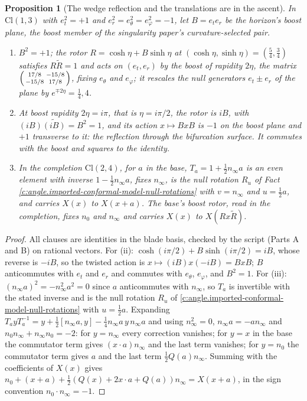 \documentclass[11pt]{article}
\newtheorem{proposition}[theorem]{Proposition}
\theoremstyle{definition}
\theoremstyle{plain}
\providecommand{\Cl}{}\renewcommand{\Cl}{\mathrm{Cl}}
\providecommand{\nInf}{}\renewcommand{\nInf}{n_\infty}
\providecommand{\nO}{}\renewcommand{\nO}{n_0}
\begin{document}
\begin{proposition}[The wedge reflection and the translations are in the ascent]\label{c:angle.wedge-reflection-translations-are-ascent}
In $\Cl(1,3)$ with $e_{t}^{2} = +1$ and $e_{r}^{2} = e_{\theta}^{2} = e_{\varphi}^{2} = -1$, let $B = e_{t}e_{r}$ be the horizon's boost plane, the boost member of the singularity paper's curvature-selected pair.
\begin{enumerate}
\item[(i)] $B^{2} = +1$; the rotor $R = \cosh\eta + B\sinh\eta$ at $(\cosh\eta, \sinh\eta) = (\tfrac54, \tfrac34)$ satisfies $R\widetilde{R} = 1$ and acts on $(e_{t}, e_{r})$ by the boost of rapidity $2\eta$, the matrix $\begin{psmallmatrix} 17/8 & -15/8 \\ -15/8 & 17/8\end{psmallmatrix}$, fixing $e_{\theta}$ and $e_{\varphi}$; it rescales the null generators $e_{t} \pm e_{r}$ of the plane by $e^{\mp 2\eta} = \tfrac14, 4$.
\item[(ii)] At boost rapidity $2\eta = i\pi$, that is $\eta = i\pi/2$, the rotor is $iB$, with $(iB)\widetilde{(iB)} = B^{2} = 1$, and its action $x \mapsto BxB$ is $-1$ on the boost plane and $+1$ transverse to it: the reflection through the bifurcation surface. It commutes with the boost and squares to the identity.
\item[(iii)] In the completion $\Cl(2,4)$, for $a$ in the base, $T_{a} = 1 + \tfrac12\nInf a$ is an even element with inverse $1 - \tfrac12\nInf a$, fixes $\nInf$, is the null rotation $R_{u}$ of Fact \ref{c:angle.imported-conformal-model-null-rotations} with $v = \nInf$ and $u = \tfrac12 a$, and carries $X(x)$ to $X(x + a)$. The base's boost rotor, read in the completion, fixes $\nO$ and $\nInf$ and carries $X(x)$ to $X(Rx\widetilde{R})$.
\end{enumerate}
\end{proposition}
\begin{proof}
All clauses are identities in the blade basis, checked by the script (Parts A and B) on rational vectors. For (ii): $\cosh(i\pi/2) + B\sinh(i\pi/2) = iB$, whose reverse is $-iB$, so the twisted action is $x \mapsto (iB)x(-iB) = BxB$; $B$ anticommutes with $e_{t}$ and $e_{r}$ and commutes with $e_{\theta}$, $e_{\varphi}$, and $B^{2} = 1$. For (iii): $(\nInf a)^{2} = -\nInf^{2}a^{2} = 0$ since $a$ anticommutes with $\nInf$, so $T_{a}$ is invertible with the stated inverse and is the null rotation $R_{u}$ of \ref{c:angle.imported-conformal-model-null-rotations} with $u = \tfrac12 a$. Expanding $T_{a}yT_{a}^{-1} = y + \tfrac12[\nInf a, y] - \tfrac14\nInf a\,y\,\nInf a$ and using $\nInf^{2} = 0$, $\nInf a = -a\nInf$ and $\nO\nInf + \nInf\nO = -2$: for $y = \nInf$ every correction vanishes; for $y = x$ in the base the commutator term gives $(x \cdot a)\nInf$ and the last term vanishes; for $y = \nO$ the commutator term gives $a$ and the last term $\tfrac12 Q(a)\nInf$. Summing with the coefficients of $X(x)$ gives $\nO + (x + a) + \tfrac12(Q(x) + 2x\cdot a + Q(a))\nInf = X(x + a)$, in the sign convention $\nO \cdot \nInf = -1$.

\end{proof}
\end{document}
